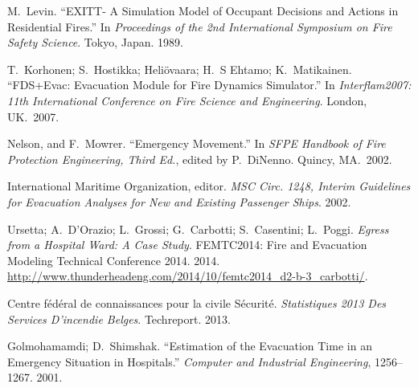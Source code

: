 \documentclass{style/llncs}
\begin{document}
{\begin{thebibliography}{36}
M.~Levin. \textquotedblleft{}EXITT- A Simulation Model of Occupant Decisions and Actions in Residential Fires.\textquotedblright{} In \emph{Proceedings of the 2nd International Symposium on Fire Safety Science}. Tokyo, Japan. 1989.\label{7}%

T.~Korhonen; S.~Hostikka; Heliövaara; H.~S Ehtamo; K.~Matikainen. \textquotedblleft{}FDS+Evac: Evacuation Module for Fire Dynamics Simulator.\textquotedblright{} In \emph{Interflam2007: 11th International Conference on Fire Science and Engineering}. London, UK.~2007.\label{15}%

Nelson, and F.~Mowrer. \textquotedblleft{}Emergency Movement.\textquotedblright{} In \emph{SFPE Handbook of Fire Protection Engineering, Third Ed.}, edited by P.~DiNenno. Quincy, MA.~2002.\label{33}%

International Maritime Organization, editor. \emph{MSC Circ. 1248, Interim Guidelines for Evacuation Analyses for New and Existing Passenger Ships}. 2002.\label{23}%

Ursetta; A.~D’Orazio; L.~Grossi; G.~Carbotti; S.~Casentini; L.~Poggi. \emph{Egress from a Hospital Ward: A Case Study}. FEMTC2014: Fire and Evacuation Modeling Technical Conference 2014. 2014. \href{http://www.thunderheadeng.com/2014/10/femtc2014_d2-b-3_carbotti/}{{\ttfamily http://\hspace{0pt}www.\hspace{0pt}thunderheadeng.\hspace{0pt}com/\hspace{0pt}2014/\hspace{0pt}10/\hspace{0pt}femtc2014\_\hspace{0pt}d2-\hspace{0pt}b-\hspace{0pt}3\_\hspace{0pt}carbotti/\hspace{0pt}}}.\label{19}%

Centre fédéral de connaissances pour la civile Sécurité. \emph{Statistiques 2013 Des Services D’incendie Belges}. Techreport. 2013.\label{1}%

Golmohamamdi; D.~Shimshak. \textquotedblleft{}Estimation of the Evacuation Time in an Emergency Situation in Hospitals.\textquotedblright{} \emph{Computer and Industrial Engineering}, 1256–1267. 2001.\label{17}%


\end{thebibliography}}
\end{document}
